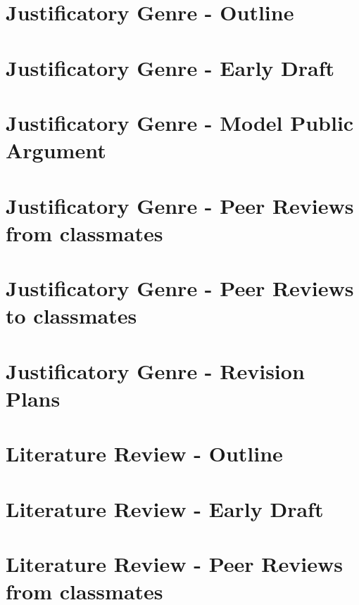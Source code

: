 \documentclass{article}
\begin{document}

\section{Justificatory Genre - Outline}


\newpage

\section{Justificatory Genre - Early Draft}


\newpage

\section{Justificatory Genre - Model Public Argument}


\newpage

\section{Justificatory Genre - Peer Reviews from classmates}


\newpage

\section{Justificatory Genre - Peer Reviews to classmates}


\newpage

\section{Justificatory Genre - Revision Plans}


\newpage


\section{Literature Review - Outline}


\newpage

\section{Literature Review - Early Draft}


\newpage

\section{Literature Review - Peer Reviews from classmates}


\newpage
\end{document}
